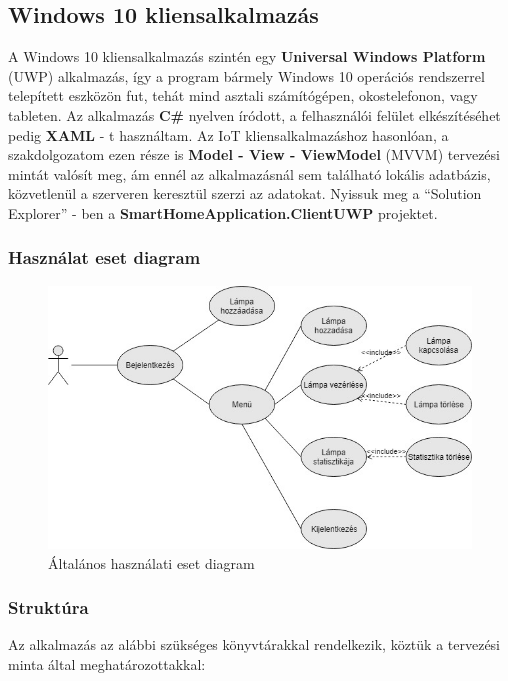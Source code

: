 \documentclass[a4paper,12pt]{report}
\begin{document}
    \subsection{Windows 10 kliensalkalmazás}
    A Windows 10 kliensalkalmazás szintén egy \textbf{Universal Windows Platform} (UWP) alkalmazás, így a program bármely Windows 10
    operációs rendszerrel telepített eszközön fut, tehát mind asztali számítógépen, okostelefonon, vagy tableten. Az alkalmazás \textbf{C\#} nyelven
    íródott, a felhasználói felület elkészítéséhet pedig \textbf{XAML} - t használtam. Az IoT kliensalkalmazáshoz hasonlóan, a szakdolgozatom
    ezen része is \textbf{Model - View - ViewModel} (MVVM) tervezési mintát valósít meg, ám ennél az alkalmazásnál sem található lokális
    adatbázis, közvetlenül a szerveren keresztül szerzi az adatokat. Nyissuk meg a ``Solution Explorer'' - ben a \textbf{SmartHomeApplication.ClientUWP}
    projektet.

    \subsubsection{Használat eset diagram}

    \begin{figure}[H]
        \centering
        \includegraphics[width=\linewidth]{images/usecase.jpg}
        \caption{Általános használati eset diagram}
        \label{fig: UseCase}
    \end{figure}

    \subsubsection{Struktúra}
    Az alkalmazás az alábbi szükséges könyvtárakkal rendelkezik, köztük a tervezési minta által meghatározottakkal:
\end{document}
